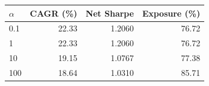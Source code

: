 \begin{tabular}{lrrr}
\toprule
$\alpha$ & CAGR (\%) & Net Sharpe & Exposure (\%) \\
\midrule
0.1 & 22.33 & 1.2060 & 76.72 \\
1 & 22.33 & 1.2060 & 76.72 \\
10 & 19.15 & 1.0767 & 77.38 \\
100 & 18.64 & 1.0310 & 85.71 \\
\bottomrule
\end{tabular}
